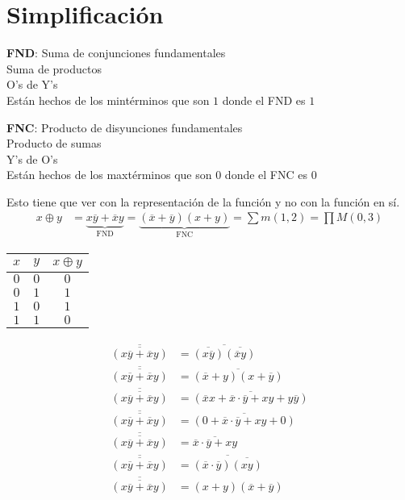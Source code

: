 \documentclass[../main.tex]{subfiles}
\begin{document}
\chapter{Simplificación}
\thispagestyle{fancy}

\noindent \textbf{FND}: Suma de conjunciones fundamentales\\
Suma de productos\\
O's de Y's\\
Están hechos de los mintérminos que son $1$ donde el FND es $1$

\noindent \textbf{FNC}: Producto de disyunciones fundamentales\\
Producto de sumas\\
Y's de O's\\
Están hechos de los maxtérminos que son $0$ donde el FNC es $0$

Esto tiene que ver con la representación de la función y no con la función en sí.
\begin{align*}
	x\oplus y &= \underbrace{x\overline{y}+\overline{x}y}_{\text{FND}}
	=\underbrace{(\overline{x}+\overline{y})(x+y)}_{\text{FNC}}
	=\sum m(1,2)=\prod M(0,3)
\end{align*}
\begin{center}
	\begin{tabular}{cc|c}
		$x$ & $y$ & $x\oplus y$\\
		\hline
		$0$ & $0$ & $0$\\
		$0$ & $1$ & $1$\\
		$1$ & $0$ & $1$\\
		$1$ & $1$ & $0$
	\end{tabular}
\end{center}
\begin{align*}
	\overline{\overline{(x\overline{y}+\overline{x}y)}} &=
	\overline{\overline{(x\overline{y})}\overline{(\overline{x}y)}}\\
	\overline{\overline{(x\overline{y}+\overline{x}y)}} &=
	\overline{(\overline{x}+y)(x+\overline{y})}\\
	\overline{\overline{(x\overline{y}+\overline{x}y)}} &=
	\overline{(\overline{x}x+\overline{x}\cdot\overline{y}+xy+y\overline{y})}\\
	\overline{\overline{(x\overline{y}+\overline{x}y)}} &=
	\overline{(0+\overline{x}\cdot\overline{y}+xy+0)}\\
	\overline{\overline{(x\overline{y}+\overline{x}y)}} &=
	\overline{\overline{x}\cdot\overline{y}+xy}\\
	\overline{\overline{(x\overline{y}+\overline{x}y)}} &=
	\overline{(\overline{x}\cdot\overline{y})\overline{(xy)}}\\
	\overline{\overline{(x\overline{y}+\overline{x}y)}} &=
	\boxed
	{
		(x+y)(\overline{x}+\overline{y})
	}
\end{align*}
\end{document}
